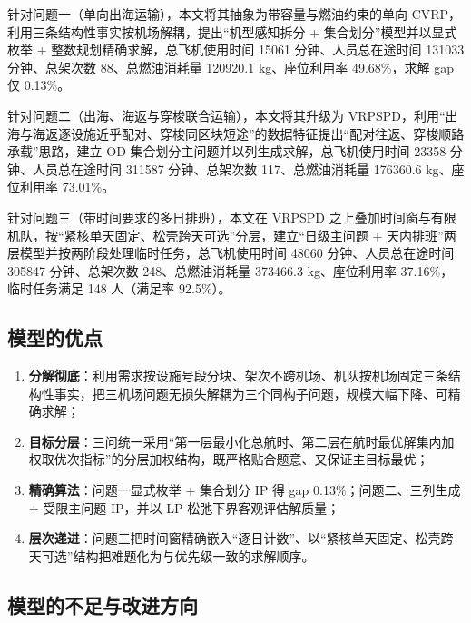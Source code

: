 \documentclass[UTF8,zihao=-4]{ctexart}
\numberwithin{figure}{section}
\numberwithin{table}{section}
\begin{document}
针对问题一（单向出海运输），本文将其抽象为带容量与燃油约束的单向 CVRP，利用三条结构性事实按机场解耦，提出“机型感知拆分 + 集合划分”模型并以显式枚举 + 整数规划精确求解，总飞机使用时间 15061 分钟、人员总在途时间 131033 分钟、总架次数 88、总燃油消耗量 120920.1 kg、座位利用率 49.68\%，求解 gap 仅 0.13\%。

针对问题二（出海、海返与穿梭联合运输），本文将其升级为 VRPSPD，利用“出海与海返逐设施近乎配对、穿梭同区块短途”的数据特征提出“配对往返、穿梭顺路承载”思路，建立 OD 集合划分主问题并以列生成求解，总飞机使用时间 23358 分钟、人员总在途时间 311587 分钟、总架次数 117、总燃油消耗量 176360.6 kg、座位利用率 73.01\%。

针对问题三（带时间要求的多日排班），本文在 VRPSPD 之上叠加时间窗与有限机队，按“紧核单天固定、松壳跨天可选”分层，建立“日级主问题 + 天内排班”两层模型并按两阶段处理临时任务，总飞机使用时间 48060 分钟、人员总在途时间 305847 分钟、总架次数 248、总燃油消耗量 373466.3 kg、座位利用率 37.16\%，临时任务满足 148 人（满足率 92.5\%）。

\subsection{模型的优点}

\begin{enumerate}
  \item \textbf{分解彻底}：利用需求按设施号段分块、架次不跨机场、机队按机场固定三条结构性事实，把三机场问题无损失解耦为三个同构子问题，规模大幅下降、可精确求解；
  \item \textbf{目标分层}：三问统一采用“第一层最小化总航时、第二层在航时最优解集内加权取优次指标”的分层加权结构，既严格贴合题意、又保证主目标最优；
  \item \textbf{精确算法}：问题一显式枚举 + 集合划分 IP 得 gap 0.13\%；问题二、三列生成 + 受限主问题 IP，并以 LP 松弛下界客观评估解质量；
  \item \textbf{层次递进}：问题三把时间窗精确嵌入“逐日计数”、以“紧核单天固定、松壳跨天可选”结构把难题化为与优先级一致的求解顺序。
\end{enumerate}

\subsection{模型的不足与改进方向}
\end{document}
